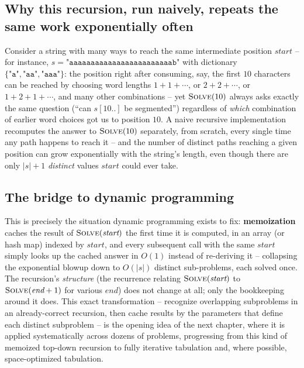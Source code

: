 \subsection*{Why this recursion, run naively, repeats the same work exponentially often}

Consider a string with many ways to reach the same intermediate position
$\textit{start}$ -- for instance, $s=\texttt{"aaaaaaaaaaaaaaaaaaaaaaaab"}$
with dictionary $\{\texttt{"a"},\texttt{"aa"},\texttt{"aaa"}\}$: the
position right after consuming, say, the first $10$ characters can be
reached by choosing word lengths $1+1+\cdots$, or $2+2+\cdots$, or
$1+2+1+\cdots$, and many other combinations -- yet
$\textsc{Solve}(10)$ always asks exactly the same question (``can
$s[10..]$ be segmented'') regardless of \emph{which} combination of
earlier word choices got us to position $10$. A naive recursive
implementation recomputes the answer to $\textsc{Solve}(10)$ separately,
from scratch, every single time any path happens to reach it -- and the
number of distinct paths reaching a given position can grow
exponentially with the string's length, even though there are only
$|s|+1$ \emph{distinct} values $\textit{start}$ could ever take.

\subsection*{The bridge to dynamic programming}

This is precisely the situation dynamic programming exists to fix:
\textbf{memoization} caches the result of $\textsc{Solve}(\textit{start})$
the first time it is computed, in an array (or hash map) indexed by
$\textit{start}$, and every subsequent call with the same
$\textit{start}$ simply looks up the cached answer in $O(1)$ instead of
re-deriving it -- collapsing the exponential blowup down to $O(|s|)$
distinct sub-problems, each solved once. The recursion's
\emph{structure} (the recurrence relating $\textsc{Solve}(\textit{start})$
to $\textsc{Solve}(\textit{end}+1)$ for various $\textit{end}$) does not
change at all; only the bookkeeping around it does. This exact
transformation -- recognize overlapping subproblems in an already-correct
recursion, then cache results by the parameters that define each distinct
subproblem -- is the opening idea of the next chapter, where it is
applied systematically across dozens of problems, progressing from this
kind of memoized top-down recursion to fully iterative tabulation and,
where possible, space-optimized tabulation.


